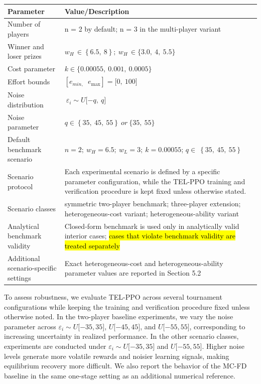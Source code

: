 \documentclass[
]{article}
\begin{document}
\begin{longtable}[]{@{}
  >{\centering\arraybackslash}p{}
  >{\centering\arraybackslash}p{}@{}}
\toprule\noalign{}
\begin{minipage}[b]{\linewidth}\centering
Parameter
\end{minipage} & \begin{minipage}[b]{\linewidth}\centering
Value/Description
\end{minipage} \\
\midrule\noalign{}
\endhead
\bottomrule\noalign{}
\endlastfoot
Number of players & n = 2 by default; n = 3 in the multi-player
variant \\
Winner and loser prizes &
\(w_{H\ } \in \left\{ 6.5,\ 8 \right\};\ w_{H\ } \in \{ 3.0,\ 4,\ 5.5\}\) \\
Cost parameter & \(k \in \{ 0.00055,\ 0.001,\ 0.0005\}\) \\
Effort bounds &
\(\left\lbrack e_{min,\ \ }\ e_{\max} \right\rbrack = \lbrack 0,\ 100\rbrack\) \\
Noise distribution &
\({\ \varepsilon}_{i} \sim U\lbrack - q,\ q\rbrack\) \\
Noise parameter &
\(q \in \left\{ 35,\ 45,\ 55 \right\}\ or\ \{ 35,\ 55\}\) \\
Default benchmark scenario &
\(n = 2;\ w_{H} = 6.5;\ w_{L} = 3;\ k = 0.00055\);
\(q \in \ \left\{ 35,\ 45,\ 55 \right\}\) \\
Scenario protocol & Each experimental scenario is defined by a specific
parameter configuration, while the TEL-PPO training and verification
procedure is kept fixed unless otherwise stated. \\
Scenario classes & symmetric two-player benchmark; three-player
extension; heterogeneous-cost variant; heterogeneous-ability variant \\
Analytical benchmark validity & Closed-form benchmark is used only in
analytically valid interior cases; \hl{cases that violate benchmark
validity are treated separately} \\
Additional scenario-specific settings & Exact heterogeneous-cost and
heterogeneous-ability parameter values are reported in Section 5.2 \\
\end{longtable}

To assess robustness, we evaluate TEL-PPO across several tournament
configurations while keeping the training and verification procedure
fixed unless otherwise noted. In the two-player baseline experiments, we
vary the noise parameter across
\(\varepsilon_{i} \sim U\lbrack - 35,35\rbrack\),
\(U\lbrack - 45,45\rbrack\), and \(U\lbrack - 55,55\rbrack\),
corresponding to increasing uncertainty in realized performance. In the
other scenario classes, experiments are conducted under
\(\varepsilon_{i} \sim U\lbrack - 35,35\rbrack\) and
\(U\lbrack - 55,55\rbrack\). Higher noise levels generate more volatile
rewards and noisier learning signals, making equilibrium recovery more
difficult. We also report the behavior of the MC-FD baseline in the same
one-stage setting as an additional numerical reference.
\end{document}
